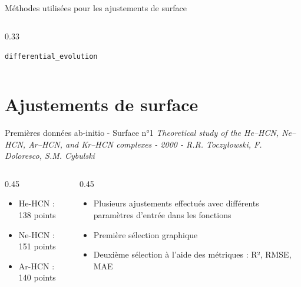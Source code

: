 \documentclass[10pt, aspectratio=169]{beamer}
\begin{document}
\begin{frame}[fragile]{Méthodes utilisées pour les ajustements de surface}
\begin{columns}[T]
\begin{column}{0.33\textwidth\small}
\begin{block}{\texttt{differential\_evolution}}
\begin{itemize}
        \end{itemize} 
      \end{block}
    \end{column}
  \end{columns}
\end{frame}



\section{Ajustements de surface}

\begin{frame}{Premières données ab-initio - Surface n°1}
  \textit{Theoretical study of the He–HCN, Ne–HCN, Ar–HCN, and Kr–HCN complexes
  - 2000 - R.R. Toczyłowski, F. Doloresco, S.M. Cybulski}
  \begin{columns}[T]
    \begin{column}{0.45\textwidth}
      \begin{block}{}
        \begin{itemize}
          \item He-HCN : 138 points 
          \item Ne-HCN : 151 points 
          \item Ar-HCN : 140 points
        \end{itemize}
      \end{block}
      
          \end{column}

    \begin{column}{0.45\textwidth}
       \begin{block}{}
        \begin{itemize}
          \item Plusieurs ajustements effectués avec différents paramètres d'entrée dans les fonctions
          \item Première sélection graphique 
          \item Deuxième sélection à l'aide des métriques : R², RMSE, MAE 
        \end{itemize}
      \end{block}
    \end{column}
  
  \end{columns}
  

\end{frame}
\end{document}
